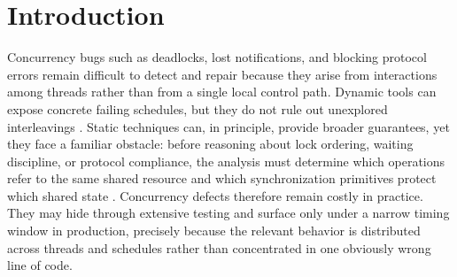 \section{Introduction}
\label{sec:introduction}

Concurrency bugs such as deadlocks, lost notifications, and blocking protocol errors remain difficult to detect and repair because they arise from interactions among threads rather than from a single local control path. Dynamic tools can expose concrete failing schedules, but they do not rule out unexplored interleavings \cite{Godefroid1997VeriSoft,Musuvathi2008Heisenbugs,Burckhardt2010RandomizedScheduler}. Static techniques can, in principle, provide broader guarantees, yet they face a familiar obstacle: before reasoning about lock ordering, waiting discipline, or protocol compliance, the analysis must determine which operations refer to the same shared resource and which synchronization primitives protect which shared state \cite{Engler2003RacerX,Flanagan2000TypeBasedRace,Flanagan2003Atomicity,Boyapati2002Ownership,Naik2006StaticRaceJava}. Concurrency defects therefore remain costly in practice. They may hide through extensive testing and surface only under a narrow timing window in production, precisely because the relevant behavior is distributed across threads and schedules rather than concentrated in one obviously wrong line of code.

